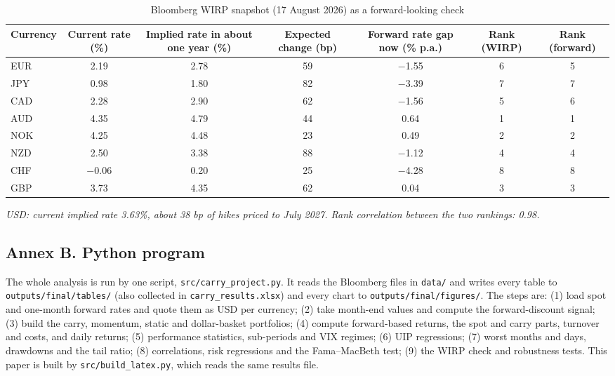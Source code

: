 \documentclass[11pt,a4paper]{article}
\begin{document}
\begin{table}[!htbp]\centering\small
\caption{Bloomberg WIRP snapshot (17 August 2026) as a forward-looking check}\label{tab:wirp}
\begin{tabularx}{\textwidth}{lCCCCCC}
\toprule Currency & Current rate (\%) & Implied rate in about one year (\%) & Expected change (bp) & Forward rate gap now (\% p.a.) & Rank (WIRP) & Rank (forward) \\ \midrule
EUR & 2.19 & 2.78 & 59 & $-$1.55 & 6 & 5 \\
JPY & 0.98 & 1.80 & 82 & $-$3.39 & 7 & 7 \\
CAD & 2.28 & 2.90 & 62 & $-$1.56 & 5 & 6 \\
AUD & 4.35 & 4.79 & 44 & 0.64 & 1 & 1 \\
NOK & 4.25 & 4.48 & 23 & 0.49 & 2 & 2 \\
NZD & 2.50 & 3.38 & 88 & $-$1.12 & 4 & 4 \\
CHF & $-$0.06 & 0.20 & 25 & $-$4.28 & 8 & 8 \\
GBP & 3.73 & 4.35 & 62 & 0.04 & 3 & 3 \\
\bottomrule\end{tabularx}
\par\vspace{0.3em}\footnotesize\emph{USD: current implied rate 3.63\%, about 38 bp of hikes priced to July 2027. Rank correlation between the two rankings: 0.98.}
\end{table}

\subsection*{Annex B. Python program}
The whole analysis is run by one script, \texttt{src/carry\_project.py}. It reads the Bloomberg files in \texttt{data/} and writes
every table to \texttt{outputs/final/tables/} (also collected in \texttt{carry\_results.xlsx}) and every chart to
\texttt{outputs/final/figures/}. The steps are: (1) load spot and one-month forward rates and quote them as USD per currency;
(2) take month-end values and compute the forward-discount signal; (3) build the carry, momentum, static and dollar-basket
portfolios; (4) compute forward-based returns, the spot and carry parts, turnover and costs, and daily returns; (5) performance
statistics, sub-periods and VIX regimes; (6) UIP regressions; (7) worst months and days, drawdowns and the tail ratio;
(8) correlations, risk regressions and the Fama--MacBeth test; (9) the WIRP check and robustness tests. This paper is built by
\texttt{src/build\_latex.py}, which reads the same results file.
\end{document}
